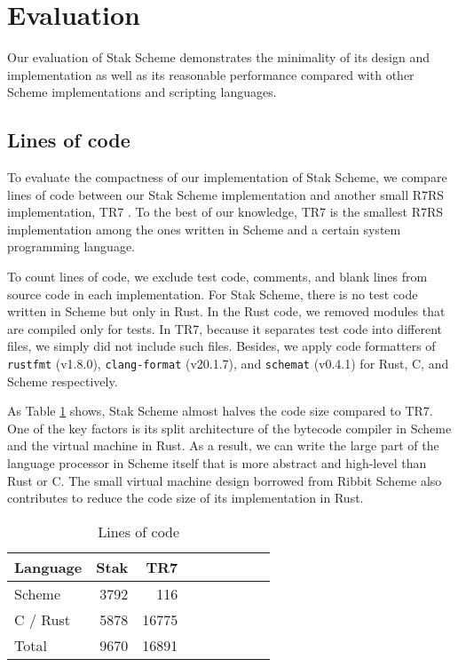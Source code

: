 \documentclass[sigplan, anonymous, review]{acmart}
\begin{document}
\section{Evaluation} \label{evaluation}

Our evaluation of Stak Scheme demonstrates the minimality of its design and
implementation as well as its reasonable performance compared with
other Scheme implementations and scripting languages.

\subsection{Lines of code}

To evaluate the compactness of our implementation of Stak Scheme,
we compare lines of code between our Stak Scheme implementation and
another small R7RS implementation, TR7 \cite{tr7}.
To the best of our knowledge, TR7 is the smallest R7RS implementation
among the ones written in Scheme and a certain system programming language.

To count lines of code, we exclude test code, comments, and blank
lines from source code in each implementation.
For Stak Scheme, there is no test code written in Scheme but only in Rust.
In the Rust code, we removed modules that are compiled only for tests.
In TR7, because it separates test code into different files, we simply did not
include such files.
Besides, we apply code formatters of \texttt{rustfmt} (v1.8.0),
\texttt{clang-format} (v20.1.7), and \texttt{schemat} (v0.4.1) for
Rust, C, and Scheme respectively.

As Table \ref{table:loc} shows, Stak Scheme almost
halves the code size compared to TR7.
One of the key factors is its split architecture of the bytecode
compiler in Scheme and the virtual machine in Rust.
As a result, we can write the large part of the language processor in Scheme
itself that is more abstract and high-level than Rust or C.
The small virtual machine design borrowed from Ribbit Scheme also
contributes to reduce the code size of its implementation in Rust.

\begin{table}
  \begin{center}
    \caption{Lines of code}
    \label{table:loc}
    \begin{tabular}{l|rrrrrrrr}
      \hline
      Language & Stak & TR7  \\
      \hline
      Scheme & 3792 & 116 \\
      C / Rust & 5878 & 16775 \\
      Total & 9670 & 16891 \\
      \hline
    \end{tabular}
  \end{center}
\end{table}
\end{document}
